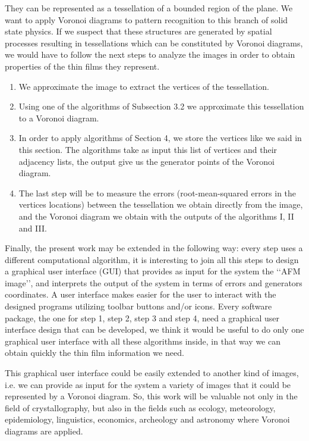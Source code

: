 \documentclass[a4paper,12pt]{article}
\newtheorem*{Condition 1}{Condition 1}
\newtheorem*{Condition 2}{Condition 2}
\theoremstyle{definition}
\theoremstyle{remark}
\begin{document}
They can be represented as a tessellation of a bounded region of the plane. We want to apply Voronoi diagrams to pattern recognition to this branch of solid state physics. If we suspect that these structures are generated by spatial processes resulting in tessellations which can be constituted by Voronoi diagrams, we would have to follow the next steps to analyze the images in order to obtain properties of the thin films they represent.

\begin{enumerate}
\item  We approximate the image to extract the vertices of the tessellation.
\item  Using one of the algorithms of Subsection 3.2 we approximate this tessellation to a Voronoi diagram.
\item In order to apply algorithms of Section 4, we store the vertices like we said in this section. The algorithms take as input this list of vertices and their adjacency lists, the output give us the generator points of the Voronoi diagram.
\item The last step will be to measure the errors (root-mean-squared errors in the vertices locations) between the tessellation we obtain directly from the image, and the Voronoi diagram we obtain with the outputs of the algorithms I, II and III.   
\end{enumerate}

Finally, the present work may be extended in the following way: every step uses a different computational algorithm, it is interesting to join all this steps to design a graphical user interface (GUI) that provides as input for the system the \lq\lq AFM image\rq\rq, and interprets the output of the system in terms of errors and generators coordinates. A user interface makes easier for the user to interact with the designed programs utilizing toolbar buttons and/or icons. Every software package, the one for step 1, step 2, step 3 and step 4, need a graphical user interface design that can be developed, we think it would be useful to do only one graphical user interface with all these algorithms inside, in that way we can obtain quickly the thin film information we need. 

This graphical user interface could be easily extended to another kind of images, i.e. we can provide as input for the system a variety of images that it could be represented by a Voronoi diagram. So, this work will be valuable not only in the field of crystallography, but also in the fields such as ecology, meteorology, epidemiology, linguistics, economics, archeology and astronomy where Voronoi diagrams are applied. 
\end{document}
